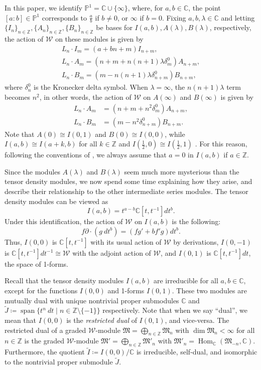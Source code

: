 \documentclass[11pt, svgnames]{amsart}
\DeclareMathOperator{\Hom}{Hom}
\DeclareMathOperator{\spn}{span}
\newcommand{\M}{\mathfrak{M}}
\newcommand{\ZZ}{\mathbb{Z}}
\newcommand{\CC}{\mathbb{C}}
\newcommand{\PP}{\mathbb{P}}
\newcommand{\W}{\mathcal{W}}
\newcommand{\del}{\partial}
\theoremstyle{definition}
\begin{document}
In this paper, we identify $\PP^1 = \CC \cup \{\infty\}$, where, for $a,b \in \CC$, the point $[a:b] \in \PP^1$ corresponds to $\frac{a}{b}$ if $b \neq 0$, or $\infty$ if $b = 0$. Fixing $a,b,\lambda \in \CC$ and letting $\{I_n\}_{n \in \ZZ}, \{A_n\}_{n \in \ZZ}, \{B_n\}_{n \in \ZZ}$ be bases for $I(a,b), A(\lambda), B(\lambda)$, respectively, the action of $\W$ on these modules is given by
\begin{equation}\label{eq:defining modules}
    \begin{gathered}
        L_n \cdot I_m = (a + bn +m)I_{n+m}, \\
        L_n \cdot A_m = (n + m + n(n + 1)\lambda \delta_m^0)A_{n+m}, \\
        L_n \cdot B_m = (m - n(n + 1)\lambda \delta_{n+m}^0)B_{n+m},
    \end{gathered}
\end{equation}
where $\delta_n^0$ is the Kronecker delta symbol. When $\lambda = \infty$, the $n(n + 1)\lambda$ term becomes $n^2$, in other words, the action of $\W$ on $A(\infty)$ and $B(\infty)$ is given by
\begin{align*}
    L_n \cdot A_m &= (n + m + n^2 \delta_m^0)A_{n+m}, \\
    L_n \cdot B_m &= (m - n^2 \delta_{n+m}^0)B_{n+m}.
\end{align*}
Note that $A(0) \cong I(0,1)$ and $B(0) \cong I(0,0)$, while $I(a,b) \cong I(a + k,b)$ for all $k \in \ZZ$ and $I(\frac{1}{2},0) \cong I(\frac{1}{2},1)$ \cite[Lemma 2.1]{GaoJiangPei}. For this reason, following the conventions of \cite{GaoJiangPei}, we always assume that $a = 0$ in $I(a,b)$ if $a \in \ZZ$.

Since the modules $A(\lambda)$ and $B(\lambda)$ seem much more mysterious than the tensor density modules, we now spend some time explaining how they arise, and describe their relationship to the other intermediate series modules. The tensor density modules can be viewed as
$$I(a,b) = t^{a - b}\CC[t,t^{-1}]dt^b.$$
Under this identification, the action of $\W$ on $I(a,b)$ is the following:
$$f\del \cdot (g \ dt^b) = (fg' + b f'g)dt^b.$$
Thus, $I(0,0)$ is $\CC[t,t^{-1}]$ with its usual action of $\W$ by derivations, $I(0,-1)$ is $\CC[t,t^{-1}]dt^{-1} \cong \W$ with the adjoint action of $\W$, and $I(0,1)$ is $\CC[t,t^{-1}]dt$, the space of 1-forms.

Recall that the tensor density modules $I(a,b)$ are irreducible for all $a,b \in \CC$, except for the functions $I(0,0)$ and 1-forms $I(0,1)$. These two modules are mutually dual with unique nontrivial proper submodules $\CC$ and $\widetilde{J} \coloneqq \spn\{t^n \ dt \mid n \in \ZZ \setminus \{-1\}\}$ respectively. Note that when we say ``dual'', we mean that $I(0,0)$ is the \emph{restricted dual} of $I(0,1)$, and vice-versa. The restricted dual of a graded $\W$-module $\M = \bigoplus_{n \in \ZZ} \M_n$ with $\dim \M_n < \infty$ for all $n \in \ZZ$ is the graded $\W$-module $\M' = \bigoplus_{n \in \ZZ}\M'_n$ with $\M'_n = \Hom_\CC(\M_{-n},\CC)$. Furthermore, the quotient $\widetilde{I} \coloneqq I(0,0)/\CC$ is irreducible, self-dual, and isomorphic to the nontrivial proper submodule $\widetilde{J}$.
\end{document}
